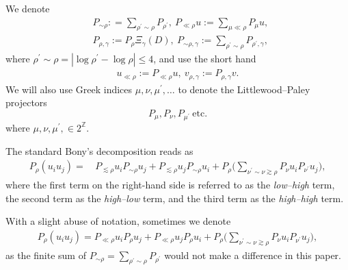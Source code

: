 \documentclass[11pt,letterpaper,reqno]{amsart}
\numberwithin{equation}{section}
\theoremstyle{definition}
\theoremstyle{remark}
\begin{document}
We denote 
\begin{align*}
 & P_{\sim\rho}: =\sum_{\rho^\prime\sim \rho } P_{\rho^\prime},\ P_{\ll \rho} u:=\sum_{\mu \ll \rho } P_\mu u,\,\\
 &P_{\rho,\gamma} := P_{\rho}\Xi_\gamma (D ), \ P_{\sim \rho,\gamma}:=\sum_{\rho^\prime\sim \rho } P_{\rho^\prime,\gamma},
\end{align*}
where \( \rho^\prime\sim \rho=|\log\rho^\prime-\log\rho|\leq 4 \),
and use the short hand 
\begin{align*}
    u_{\ll \rho} := P_{\ll \rho} u,\ v_{\rho,\gamma} := P_{\rho,\gamma}v.
\end{align*}
We will also use Greek indices $\mu, \nu, \mu^\prime, \dots$  to denote the Littlewood–Paley projectors 
\[
P_\mu, P_\nu,  P_{\mu^\prime}\  \text{etc.}  
\]
 where $  \mu, \nu,  \mu^\prime, \in  2^{\mathbb{Z}} $.

The standard Bony’s decomposition reads as
\begin{align} \label{Bony1}
P_\rho (u_i u_j) =&\,P_{\lesssim \rho } u_i P_{\sim\rho} u_j + P_{\lesssim \rho } u_j P_{\sim\rho } u_i +P_\rho \Big(\sum_{\nu^\prime \sim \nu\gtrsim \rho} P_\nu u_i P_{\nu^\prime} u_j\Big),
\end{align}
where the first term on the right-hand side is referred to as the \textit{low--high} term, the second term as the \textit{high--low} term, and the third term as the \textit{high--high} term.

 
With a slight abuse of notation, sometimes we denote
\begin{align} \label{Bony2}
	P_\rho (u_i u_j) = P_{\ll \rho } u_i P_\rho u_j + P_{\ll \rho } u_j P_\rho u_i +P_\rho \Big(\sum_{\nu^\prime \sim \nu \gtrsim \rho}  P_\nu u_i P_{\nu^\prime} u_j\Big),
\end{align}
as the finite sum of $  P_{\sim\rho}=\sum_{\rho^\prime\sim \rho } P_{\rho^\prime} $  would not make a difference in this paper.
\end{document}
